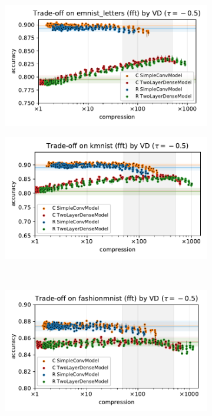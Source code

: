 \documentclass[a4paper,10pt,onecolumn]{article}
\begin{document}
\begin{figure}[b]
  \centering
  \begin{subfigure}[b]{0.5\columnwidth}
    \centering
    \includegraphics[width=\linewidth]{figure__mnist-like__trade-off/appendix__VD__emnist_letters__fft__-0.5.pdf}
  \end{subfigure}%
  \begin{subfigure}[b]{0.5\columnwidth}
    \centering
    \includegraphics[width=\linewidth]{figure__mnist-like__trade-off/appendix__VD__kmnist__fft__-0.5.pdf}
  \end{subfigure} \\ %
  \begin{subfigure}[b]{0.5\columnwidth}
    \centering
    \includegraphics[width=\linewidth]{figure__mnist-like__trade-off/appendix__VD__fashionmnist__fft__-0.5.pdf}

\end{subfigure}
\end{figure}
\end{document}
